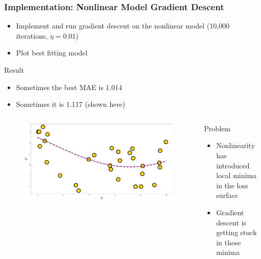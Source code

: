 \documentclass{beamer}
\begin{document}
\begin{frame}
\frametitle{Implementation: Nonlinear Model Gradient Descent}

\begin{itemize}
\item Implement and run gradient descent on the nonlinear model (10,000 iterations, $\eta = 0.01$)
\item Plot best fitting model
\end{itemize}

\begin{exampleblock}{Result}
\begin{itemize}
\item Sometimes the best MAE is 1.014
\item Sometimes it is 1.117 (shown here)
\end{itemize}
 \end{exampleblock}
 
 \begin{columns}
 
 \begin{figure}
\includegraphics[width=\textwidth]{../figures/best_nonlinear.png}
\end{figure}


\begin{alertblock}{Problem}

\begin{itemize}
\item Nonlinearity has introduced local minima in the loss surface
\item Gradient descent is getting stuck in those minima
\end{itemize}

\end{alertblock}

\end{columns}
 
 


\end{frame}
\end{document}
